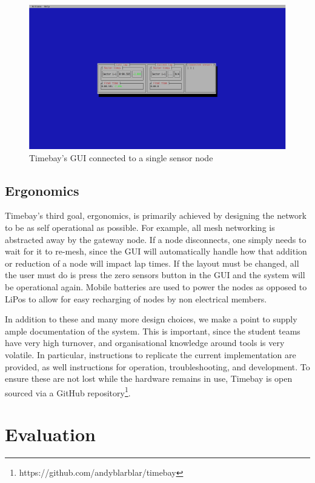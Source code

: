 \documentclass[journal]{IEEEtran}
\begin{document}
\begin{figure}[t]
    \centering
    \includegraphics[width=\linewidth]{images/gui.png}
    \caption{Timebay's GUI connected to a single sensor node}
    \label{fig:gui}
\end{figure}

\subsection{Ergonomics}

Timebay's third goal, ergonomics, is primarily achieved by designing the network to be as self operational as possible. For example, all mesh networking is abstracted away by the gateway node. If a node disconnects, one simply needs to wait for it to re-mesh, since the GUI will automatically handle how that addition or reduction of a node will impact lap times. If the layout must be changed, all the user must do is press the zero sensors button in the GUI and the system will be operational again. Mobile batteries are used to power the nodes as opposed to LiPos to allow for easy recharging of nodes by non electrical members.

In addition to these and many more design choices, we make a point to supply ample documentation of the system. This is important, since the student teams have very high turnover, and organisational knowledge around tools is very volatile. In particular, instructions to replicate the current implementation are provided, as well instructions for operation, troubleshooting, and development. To ensure these are not lost while the hardware remains in use, Timebay is open sourced via a GitHub repository\footnote{https://github.com/andyblarblar/timebay}.

\section{Evaluation}
\end{document}
